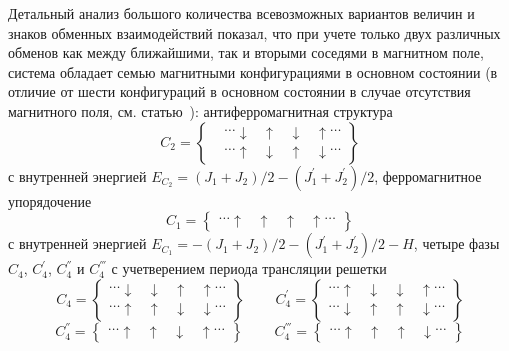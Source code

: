 Детальный анализ большого количества всевозможных вариантов величин и знаков обменных взаимодействий показал, что при учете только двух различных обменов как между ближайшими, так и вторыми соседями в магнитном поле, система обладает семью магнитными конфигурациями в основном состоянии (в отличие от шести конфигураций в основном состоянии в случае отсутствия магнитного поля, см. статью~\cite{vakbib1}): антиферромагнитная структура 
\begin{equation*}
C_2 =
\left\{\!\begin{aligned}
&\dots \downarrow\;\;\; \uparrow \;\;\;\downarrow \;\;\; \uparrow   \dots\\[1ex]
& \dots \uparrow\;\;\; \downarrow \;\;\;\uparrow \;\;\; \downarrow  \dots
\end{aligned}\right\}
\end{equation*}
с внутренней энергией $E_{C_2} = (J_1+J_2)/2-(J_{1}^{'}+J_{2}^{'})/2$, ферромагнитное упорядочение 
\begin{equation*}
C_1 =
\left\{\!\begin{aligned}
\dots \uparrow\;\;\; \uparrow \;\;\;\uparrow \;\;\; \uparrow  \dots
\end{aligned}\right\}
\end{equation*}
с внутренней энергией	$E_{C_1} = -(J_1+J_2)/2-(J_{1}^{'}+J_{2}^{'})/2-H$, четыре фазы $C_{4}$, $C_{4}^{'}$, $C_{4}^{''}$ и $C_{4}^{'''}$ с учетверением периода трансляции решетки 
\begin{equation*}
C_4 =
\left\{\!\begin{aligned}
\dots \downarrow\;\;\; \downarrow \;\;\;\uparrow \;\;\; \uparrow  \dots \\[1ex]
\dots \uparrow\;\;\; \uparrow \;\;\;\downarrow \;\;\; \downarrow  \dots  
\end{aligned}\right\}
\;\;\;\;\;\;\;\;
C_4^{'} =
\left\{\!\begin{aligned}
\dots \uparrow\;\;\; \downarrow \;\;\;\downarrow \;\;\; \uparrow \dots \\[1ex] 
\dots \downarrow\;\;\; \uparrow \;\;\;\uparrow \;\;\; \downarrow \dots 
\end{aligned}\right\}
\end{equation*}
\begin{equation*}
C_4^{''} =
\left\{\!\begin{aligned}
\dots  \uparrow\;\;\; \uparrow \;\;\;\downarrow \;\;\; \uparrow  \dots  
\end{aligned}\right\}
\;\;\;\;\;\;\;\;
C_4^{'''} =
\left\{\!\begin{aligned}
\dots \uparrow\;\;\; \uparrow \;\;\;\uparrow \;\;\; \downarrow \dots 
\end{aligned}\right\}
\end{equation*}
